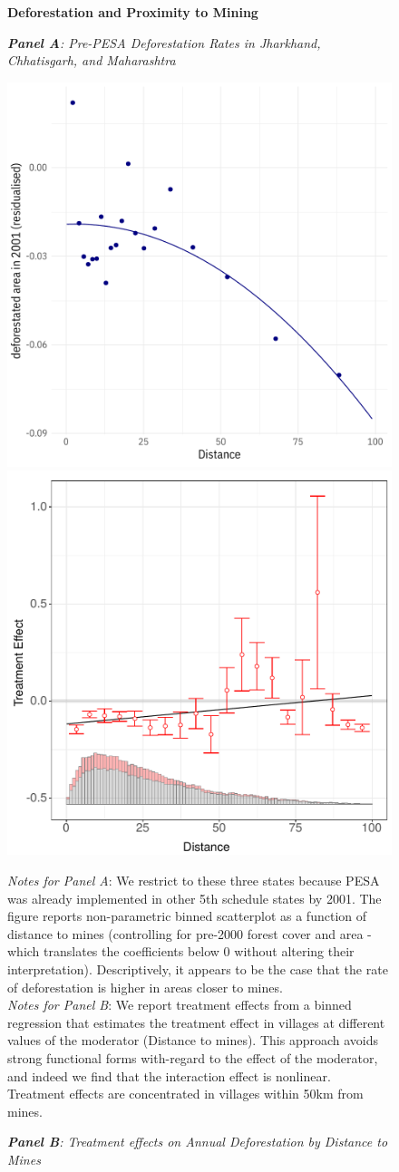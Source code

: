 \documentclass[12pt,reqno]{article}
\begin{document}





\begin{figure}[htbp!]\label{fig:mining_def}	
\caption{\textbf{Deforestation and Proximity to Mining\label{fig:mining_plot}}}
\begin{minipage}{0.45 \linewidth}
\caption*{\emph{\textbf{Panel A}: Pre-PESA Deforestation Rates in Jharkhand, Chhatisgarh, and Maharashtra }}
\centerline{\includegraphics[width=3 in,angle=0]{Output/deforestation_v_mines.pdf}}
\end{minipage}
\hfill \hfill
\begin{minipage}{0.45 \linewidth}
\caption*{\emph{\textbf{Panel B}: Treatment effects on Annual Deforestation by Distance to Mines}}
\centerline{\includegraphics[width=3 in,angle=0]{Output/Interflex_main.pdf}}
\end{minipage}

\emph{Notes for Panel A}: We restrict to these three states because PESA was already implemented in other 5th schedule states by 2001. The figure reports non-parametric binned scatterplot as a function of distance to mines (controlling for pre-2000 forest cover and area - which translates the coefficients below 0 without altering their interpretation). Descriptively, it appears to be the case that the rate of deforestation is higher in areas closer to mines. \\
\emph{Notes for Panel B}:
We report treatment effects from a binned regression that estimates the treatment effect in villages at different values of the moderator (Distance to mines). This approach avoids strong functional forms with-regard to the effect of the moderator, and indeed we find that the interaction effect is nonlinear. Treatment effects are concentrated in villages within 50km from mines.


\end{figure}
\end{document}

